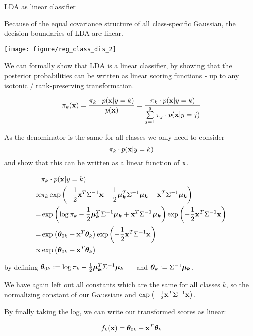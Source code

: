 \documentclass[11pt,compress,t,notes=noshow, xcolor=table]{beamer}
\begin{document}
\begin{vbframe}{LDA as linear classifier}

  Because of the equal covariance structure of all class-specific Gaussian, the decision boundaries
  of LDA are linear.

\begin{knitrout}\scriptsize
{}\color{fgcolor}

{\centering \texttt{[image: figure/reg\_class\_dis\_2]} 

}



\end{knitrout}

\framebreak


We can formally show that LDA is a linear classifier, by showing that the posterior probabilities
can be written as linear scoring functions - up to any isotonic / rank-preserving transformation.

$$
  \pikx = \frac{\pik \cdot \pdfxyk }{\pdfx} = \frac{\pik \cdot \pdfxyk}{\sumjg \pi_j \cdot \pdfxyk[j]}
$$

As the denominator is the same for all classes we only need to consider 
$$\pik \cdot \pdfxyk$$ 
and show that this can be written as a linear function of $\xv$.

\framebreak


\begin{eqnarray*}
& \pik \cdot \pdfxyk \\
  \propto& \pik \exp\left(- \frac{1}{2} \xv^T\Sigma^{-1}\xv - \frac{1}{2} \muk^T \Sigma^{-1} \muk + \xv^T \Sigma^{-1} \muk \right) \\
=& \exp\left(\log \pik  - \frac{1}{2} \muk^T \Sigma^{-1} \muk + \xv^T \Sigma^{-1} \muk \right) \exp\left(- \frac{1}{2} \xv^T\Sigma^{-1}\xv\right) \\
=& \exp\left(\thetav_{0k} + \xv^T \thetav_k\right) \exp\left(- \frac{1}{2} \xv^T\Sigma^{-1}\xv\right)\\
\propto& \exp\left(\thetav_{0k} + \xv^T \thetav_k\right) 
\end{eqnarray*}

by defining
$\thetav_{0k} := \log \pik  - \frac{1}{2} \muk^T \Sigma^{-1} \muk$ $\quad$ and $\thetav_k := \Sigma^{-1} \muk$.

\lz

We have again left out all constants which are the same for all classes $k$, 
  so the normalizing constant of our Gaussians and 
  $\exp\left(- \frac{1}{2} \xv^T\Sigma^{-1}\xv\right)$.

\lz

By finally taking the log, we can write our transformed scores as linear:  

$$ \fkx =  \thetav_{0k} + \xv^T \thetav_k $$

\end{vbframe}
\end{document}
